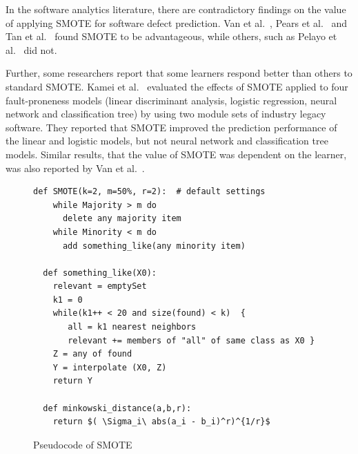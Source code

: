 \documentclass[10pt,conference]{IEEEtran}
\theoremstyle{break}
\theoremstyle{break}
\begin{document}
 


In the software analytics literature, there are contradictory findings on
the value of applying SMOTE for software defect prediction.
Van et al.~\cite{van2007experimental}, Pears et al.~\cite{pears2014synthetic} and Tan et al.~\cite{tan2015online} found SMOTE to be advantageous, while others, such as Pelayo et al.~\cite{pelayo2007applying} did not. 

Further, some researchers report that some learners respond better than others to standard SMOTE. Kamei et al.~\cite{kamei2007effects} evaluated the effects of SMOTE applied to  four fault-proneness models
(linear discriminant analysis, logistic regression, neural network and classification tree) by
using two module sets of industry legacy software. They reported that SMOTE improved the prediction performance of the linear and logistic models, but not neural network and classification tree models. Similar results, that the value of SMOTE was dependent on the learner,
was also reported by Van et al.~\cite{van2007experimental}.

\begin{figure}[!h]
\scriptsize
\begin{lstlisting}[mathescape,linewidth=8.2cm,frame=r,numbers=right]
  def SMOTE(k=2, m=50%, r=2):  # default settings
    while Majority > m do
      delete any majority item
    while Minority < m do
      add something_like(any minority item)
      
  def something_like(X0): 
    relevant = emptySet
    k1 = 0
    while(k1++ < 20 and size(found) < k)  {
       all = k1 nearest neighbors
       relevant += members of "all" of same class as X0 }
    Z = any of found
    Y = interpolate (X0, Z)
    return Y
    
  def minkowski_distance(a,b,r): 
    return $( \Sigma_i\ abs(a_i - b_i)^r)^{1/r}$
\end{lstlisting}
\caption{Pseudocode of SMOTE}
\label{fig:pseudocode}  
\end{figure}
\end{document}
